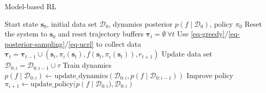 \documentclass{article}
\newcommand{\state}{\ensuremath{\mathbf{s}}}
\newcommand{\action}{\ensuremath{\mathbf{a}}}
\newcommand{\dataset}{\ensuremath{\mathcal{D}}}
\newcommand{\transitionFn}{\ensuremath{f}}
\newcommand{\policy}{\ensuremath{\pi}}
\begin{document}
\begin{algorithm}[!t]
\caption{Model-based RL}\label{alg-mbrl}
\begin{algorithmic}[1]
  \Require Start state $\state_{0}$, initial data set $\dataset_{0}$, dynamics posterior $p(\transitionFn \mid \dataset_{0})$, policy $\policy_{0}$
    \State Reset the system to $\state_{0}$ and reset trajectory buffers $\bm\tau_{t} = \emptyset \ \forall t$
      \State Use \cref{eq-greedy}/\cref{eq-posterior-sampling}/\cref{eq-ucrl} to collect data $\bm\tau_{t} = \bm\tau_{t-1} \cup (\state_{t}, \policy_{i}(\state_{t}), \transitionFn(\state_{t}, \policy_{i}(\state_{t})), r_{t+1})$
    \EndFor
    \State Update data set $\dataset_{0:i} = \dataset_{0:i-1} \cup \tau$
    \State Train dynamics $p(\transitionFn \mid \dataset_{0:i}) \leftarrow \text{update\_dynamics}(\dataset_{0:i}, p(\transitionFn \mid \dataset_{0:i-1}))$
    \State Improve policy $\pi_{i+1} \leftarrow \text{update\_policy}(p\left(\transitionFn \mid \dataset_{0:i}), \dataset_{0:i} \right)$
\EndFor
\end{algorithmic}
\end{algorithm}
\end{document}
